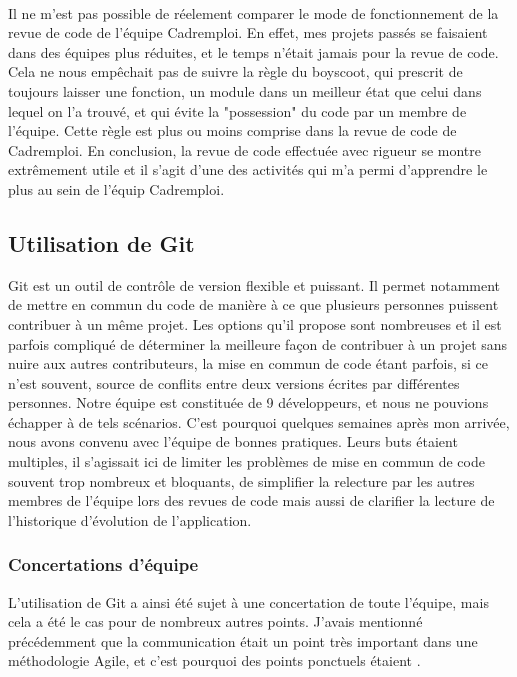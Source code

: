 \paragraph{}
Il ne m'est pas possible de réelement comparer le mode de fonctionnement de la revue de code de l'équipe Cadremploi.
En effet, mes projets passés se faisaient dans des équipes plus réduites, et le temps n'était jamais pour la revue de code.
Cela ne nous empêchait pas de suivre la règle du boyscoot, qui prescrit de toujours laisser une fonction, un module dans un meilleur état que celui dans lequel on l'a trouvé, et qui évite la "possession" du code par un membre de l'équipe.
Cette règle est plus ou moins comprise dans la revue de code de Cadremploi.
En conclusion, la revue de code effectuée avec rigueur se montre extrêmement utile et il s'agit d'une des activités qui m'a permi d'apprendre le plus au sein de l'équip Cadremploi.

\subsection{Utilisation de Git}
\label{sub:utilisation de Git}
Git est un outil de contrôle de version flexible et puissant.
Il permet notamment de mettre en commun du code de manière à ce que plusieurs personnes puissent contribuer à un même projet.
Les options qu'il propose sont nombreuses et il est parfois compliqué de déterminer la meilleure façon de contribuer à un projet sans nuire aux autres contributeurs, la mise en commun de code étant parfois, si ce n'est souvent, source de conflits entre deux versions écrites par différentes personnes.
Notre équipe est constituée de 9 développeurs, et nous ne pouvions échapper à de tels scénarios.
C'est pourquoi quelques semaines après mon arrivée, nous avons convenu avec l'équipe de bonnes pratiques.
Leurs buts étaient multiples, il s'agissait ici de limiter les problèmes de mise en commun de code souvent trop nombreux et bloquants, de simplifier la relecture par les autres membres de l'équipe lors des revues de code mais aussi de clarifier la lecture de l'historique d'évolution de l'application.

\subsubsection{Concertations d'équipe}
\label{subs:Concertations d'équipe}
L'utilisation de Git a ainsi été sujet à une concertation de toute l'équipe, mais cela a été le cas pour de nombreux autres points.
J'avais mentionné précédemment que la communication était un point très important dans une méthodologie Agile, et c'est pourquoi des points ponctuels étaient .

